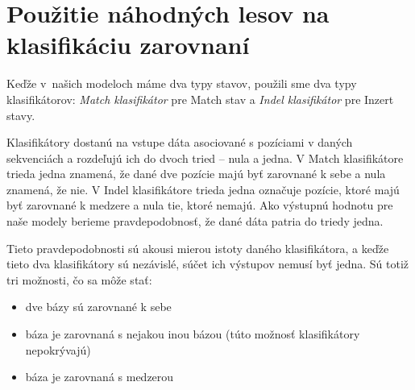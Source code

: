 


\section[Použitie náh. lesov v zarovnaní]{Použitie náhodných lesov na klasifikáciu zarovnaní}


Keďže v~našich modeloch máme dva typy stavov, použili sme dva typy klasifikátorov: \textit{Match klasifikátor} pre Match stav a \textit{Indel klasifikátor} pre Inzert stavy.

Klasifikátory dostanú na vstupe dáta asociované s pozíciami v daných sekvenciách a rozdeľujú ich do dvoch tried -- nula a jedna. V Match klasifikátore trieda jedna znamená, že dané dve pozície majú byť zarovnané k sebe a nula znamená, že nie. V Indel klasifikátore trieda jedna označuje pozície, ktoré majú byť zarovnané k medzere a nula tie, ktoré nemajú. Ako výstupnú hodnotu pre naše modely berieme pravdepodobnosť, že dané dáta patria do triedy jedna.

Tieto pravdepodobnosti sú akousi mierou istoty daného klasifikátora, a keďže tieto dva klasifikátory sú nezávislé, súčet ich výstupov nemusí byť jedna. Sú totiž tri možnosti, čo sa môže stať:
\begin{itemize}
    \item dve bázy sú zarovnané k sebe
    \item báza je zarovnaná s nejakou inou bázou (túto možnosť klasifikátory nepokrývajú)
    \item báza je zarovnaná s medzerou
\end{itemize}

